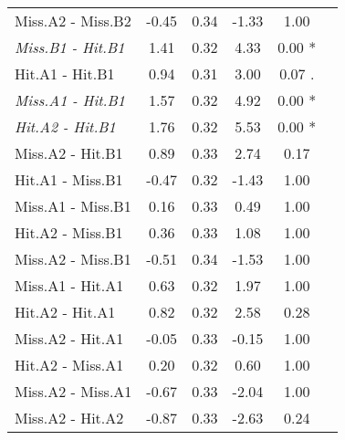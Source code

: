 \begin{landscape}
\begin{table}
\begin{multicols}{3}
\begin{tabular}{|l||*{5}{c|}}
Miss.A2 - Miss.B2 & -0.45 & 0.34 & -1.33 & 1.00 \\ 
\textit{Miss.B1 - Hit.B1} & 1.41 & 0.32 & 4.33 & 0.00 * \\ 
Hit.A1 - Hit.B1 & 0.94 & 0.31 & 3.00 & 0.07 . \\ 
\textit{Miss.A1 - Hit.B1} & 1.57 & 0.32 & 4.92 & 0.00 * \\ 
\textit{Hit.A2 - Hit.B1} & 1.76 & 0.32 & 5.53 & 0.00 * \\ 
Miss.A2 - Hit.B1 & 0.89 & 0.33 & 2.74 & 0.17 \\ 
Hit.A1 - Miss.B1 & -0.47 & 0.32 & -1.43 & 1.00 \\ 
Miss.A1 - Miss.B1 & 0.16 & 0.33 & 0.49 & 1.00 \\ 
Hit.A2 - Miss.B1 & 0.36 & 0.33 & 1.08 & 1.00 \\ 
Miss.A2 - Miss.B1 & -0.51 & 0.34 & -1.53 & 1.00 \\ 
Miss.A1 - Hit.A1 & 0.63 & 0.32 & 1.97 & 1.00 \\ 
Hit.A2 - Hit.A1 & 0.82 & 0.32 & 2.58 & 0.28 \\ 
Miss.A2 - Hit.A1 & -0.05 & 0.33 & -0.15 & 1.00 \\ 
Hit.A2 - Miss.A1 & 0.20 & 0.32 & 0.60 & 1.00 \\ 
Miss.A2 - Miss.A1 & -0.67 & 0.33 & -2.04 & 1.00 \\ 
Miss.A2 - Hit.A2 & -0.87 & 0.33 & -2.63 & 0.24 \\ 
\hline
\end{tabular}


\end{multicols}
\end{table}
\end{landscape}
